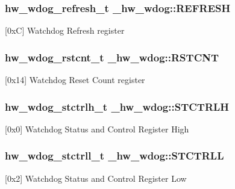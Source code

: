 \subsubsection[{\texorpdfstring{R\+E\+F\+R\+E\+SH}{REFRESH}}]{ {\bf hw\+\_\+wdog\+\_\+refresh\+\_\+t} \+\_\+hw\+\_\+wdog\+::\+R\+E\+F\+R\+E\+SH}\hypertarget{struct__hw__wdog_a62f26547c9ec2cc75875cbf783095c3c}{}\label{struct__hw__wdog_a62f26547c9ec2cc75875cbf783095c3c}
\mbox{[}0xC\mbox{]} Watchdog Refresh register 
\subsubsection[{\texorpdfstring{R\+S\+T\+C\+NT}{RSTCNT}}]{ {\bf hw\+\_\+wdog\+\_\+rstcnt\+\_\+t} \+\_\+hw\+\_\+wdog\+::\+R\+S\+T\+C\+NT}\hypertarget{struct__hw__wdog_a9667b52f07da23bf4f551ef8c10fb17a}{}\label{struct__hw__wdog_a9667b52f07da23bf4f551ef8c10fb17a}
\mbox{[}0x14\mbox{]} Watchdog Reset Count register 
\subsubsection[{\texorpdfstring{S\+T\+C\+T\+R\+LH}{STCTRLH}}]{ {\bf hw\+\_\+wdog\+\_\+stctrlh\+\_\+t} \+\_\+hw\+\_\+wdog\+::\+S\+T\+C\+T\+R\+LH}\hypertarget{struct__hw__wdog_a36bedd5f334aad2a19f8006af30646d1}{}\label{struct__hw__wdog_a36bedd5f334aad2a19f8006af30646d1}
\mbox{[}0x0\mbox{]} Watchdog Status and Control Register High 
\subsubsection[{\texorpdfstring{S\+T\+C\+T\+R\+LL}{STCTRLL}}]{ {\bf hw\+\_\+wdog\+\_\+stctrll\+\_\+t} \+\_\+hw\+\_\+wdog\+::\+S\+T\+C\+T\+R\+LL}\hypertarget{struct__hw__wdog_aa2941a1c41e61c657a8ddb0c674c682d}{}\label{struct__hw__wdog_aa2941a1c41e61c657a8ddb0c674c682d}
\mbox{[}0x2\mbox{]} Watchdog Status and Control Register Low 
